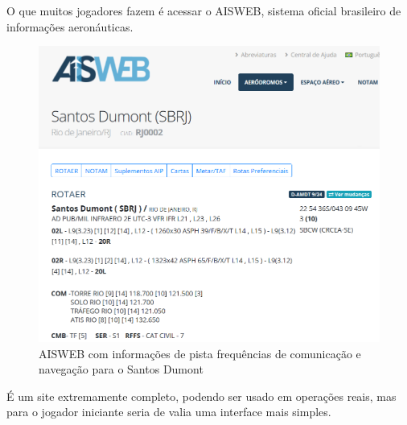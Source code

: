 O que muitos jogadores fazem é acessar o AISWEB, sistema oficial brasileiro
de informações aeronáuticas. 

\begin{figure}[ht]
    \begin{center}
    \includegraphics[width=400pt]{img/aisweb.png}
    \caption{AISWEB com informações de pista frequências de comunicação e navegação para o Santos Dumont}
    \label{fig:aisweb}
    \end{center}
\end{figure}

É um site extremamente completo, podendo
ser usado em operações reais, mas para o jogador iniciante seria 
de valia uma interface mais simples.